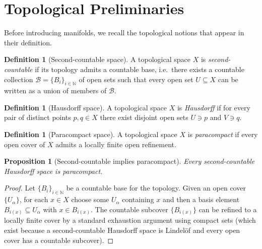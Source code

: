 \documentclass[12pt,a4paper,openany]{book}
\newtheorem{proposition}[theorem]{Proposition}
\theoremstyle{definition}
\newtheorem{definition}[theorem]{Definition}
\theoremstyle{remark}
\newcommand{\N}{\mathbb{N}}
\begin{document}
\section{Topological Preliminaries}
\label{sec:top-prelim}

Before introducing manifolds, we recall the topological notions that appear
in their definition.

\begin{definition}[Second-countable space]\label{def:second-countable}
A topological space $X$ is \emph{second-countable} if its topology admits a
countable base, i.e.\ there exists a countable collection
$\mathcal{B} = \{B_i\}_{i \in \N}$ of open sets such that every open set
$U \subseteq X$ can be written as a union of members of $\mathcal{B}$.
\end{definition}

\begin{definition}[Hausdorff space]\label{def:hausdorff}
A topological space $X$ is \emph{Hausdorff} if for every pair of distinct
points $p,q \in X$ there exist disjoint open sets $U \ni p$ and $V \ni q$.
\end{definition}

\begin{definition}[Paracompact space]\label{def:paracompact}
A topological space $X$ is \emph{paracompact} if every open cover of $X$
admits a locally finite open refinement.
\end{definition}

\begin{proposition}[Second-countable implies paracompact]
\label{prop:second-countable-paracompact}
Every second-countable Hausdorff space is paracompact.
\end{proposition}

\begin{proof}
Let $\{B_i\}_{i\in\N}$ be a countable base for the topology.  Given an open
cover $\{U_\alpha\}$, for each $x \in X$ choose some $U_\alpha$ containing
$x$ and then a basis element $B_{i(x)} \subseteq U_\alpha$ with
$x \in B_{i(x)}$.  The countable subcover $\{B_{i(x)}\}$ can be refined to
a locally finite cover by a standard exhaustion argument using compact sets
(which exist because a second-countable Hausdorff space is Lindel\"of and
every open cover has a countable subcover).
\end{proof}
\end{document}
